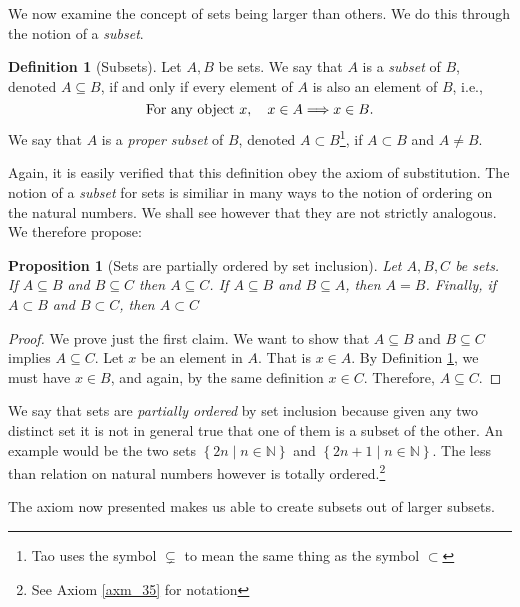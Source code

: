 \documentclass[a4paper, twocolumn]{report}
\newcounter{dummy} \numberwithin{dummy}{section}
\newtheorem{prp}[dummy]{Proposition}
\theoremstyle{definition}
\newtheorem{defn}[dummy]{Definition}
\theoremstyle{solution}
\begin{document}
We now examine the concept of sets being larger than others. We do this through
the notion of a \textit{subset}.
\begin{defn}[Subsets]
  \label{defn_3115}
  Let $A, B$ be sets. We say that $A$ is a \textit{subset} of $B$, denoted $A
  \subseteq B$, if and only if every element of $A$ is also an element of $B$,
  i.e.,
  \begin{equation}
    \notag
    \text{For any object } x, \quad x \in A \Longrightarrow x \in B.
  \end{equation}
  We say that $A$ is a \textit{proper subset} of $B$, denoted $A \subset
  B$\footnote{Tao uses the symbol $\subsetneq$ to mean the same thing as the
  symbol $\subset$}, if $A \subset B$ and $A \neq B$.
\end{defn}

\addtocounter{dummy}{2}

Again, it is easily verified that this definition obey the axiom of
substitution. The notion of a \textit{subset} for sets is similiar in many ways
to the notion of ordering on the natural numbers. We shall see however that
they are not strictly analogous. We therefore propose:


\begin{prp}[Sets are partially ordered by set inclusion]
  \label{prp_3118} 
  Let $A, B, C$ be sets. If $A \subseteq B$ and $B \subseteq C$ then $A
  \subseteq C$. If $A \subseteq B$ and $B \subseteq A$, then $A = B$. Finally,
  if $A \subset B$ and $B \subset C$, then $A \subset C$
\end{prp}
\begin{proof}
  We prove just the first claim. We want to show that $A \subseteq B$ and $B
  \subseteq C$ implies $A \subseteq C$.  Let $x$ be an element in $A$. That is
  $x \in A$. By Definition \ref{defn_3115}, we must have $x \in B$, and again,
  by the same definition $x \in C$. Therefore, $A \subseteq C$. 
\end{proof}

We say that sets are \textit{partially ordered} by set inclusion because given
any two distinct set it is not in general true that one of them is a subset of
the other. An example would be the two sets $\left\{ 2n \mid n \in \mathbb{N}
\right\}$ and $\left\{ 2n+1 \mid n \in \mathbb{N} \right\}$. The less than
relation on natural numbers however is totally ordered.\footnote{See Axiom \ref{axm_35} for notation}

\addtocounter{dummy}{3}

The axiom now presented makes us able to create subsets out of larger subsets.
\end{document}
